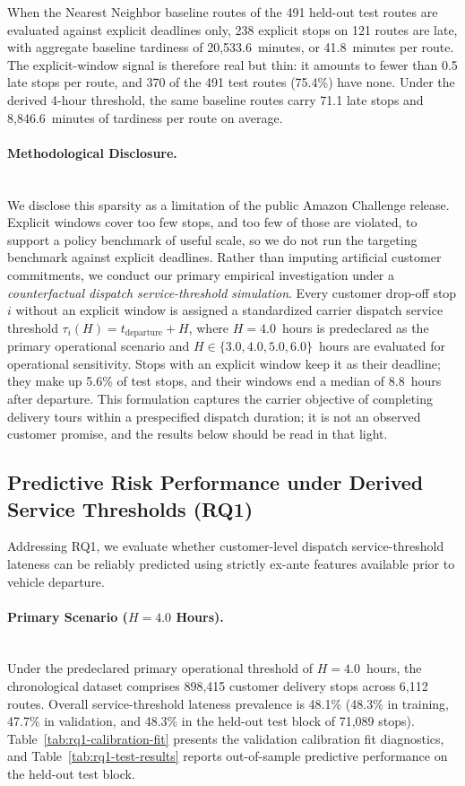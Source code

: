 \documentclass[11pt,a4paper]{article}
\begin{document}
When the Nearest Neighbor baseline routes of the 491 held-out test routes are evaluated against explicit deadlines only, 238 explicit stops on 121 routes are late, with aggregate baseline tardiness of 20,533.6~minutes, or 41.8~minutes per route. The explicit-window signal is therefore real but thin: it amounts to fewer than 0.5 late stops per route, and 370 of the 491 test routes (75.4\%) have none. Under the derived 4-hour threshold, the same baseline routes carry 71.1 late stops and 8,846.6~minutes of tardiness per route on average.

\paragraph{Methodological Disclosure.}\mbox{}\\
We disclose this sparsity as a limitation of the public Amazon Challenge release. Explicit windows cover too few stops, and too few of those are violated, to support a policy benchmark of useful scale, so we do not run the targeting benchmark against explicit deadlines. Rather than imputing artificial customer commitments, we conduct our primary empirical investigation under a \emph{counterfactual dispatch service-threshold simulation}. Every customer drop-off stop $i$ without an explicit window is assigned a standardized carrier dispatch service threshold $\tau_i(H) = t_{\text{departure}} + H$, where $H = 4.0$~hours is predeclared as the primary operational scenario and $H \in \{3.0, 4.0, 5.0, 6.0\}$~hours are evaluated for operational sensitivity. Stops with an explicit window keep it as their deadline; they make up 5.6\% of test stops, and their windows end a median of 8.8~hours after departure. This formulation captures the carrier objective of completing delivery tours within a prespecified dispatch duration; it is not an observed customer promise, and the results below should be read in that light.

\subsection{Predictive Risk Performance under Derived Service Thresholds (RQ1)}\label{sec:res-rq1}

Addressing RQ1, we evaluate whether customer-level dispatch service-threshold lateness can be reliably predicted using strictly ex-ante features available prior to vehicle departure.

\paragraph{Primary Scenario ($H = 4.0$ Hours).}\mbox{}\\
Under the predeclared primary operational threshold of $H = 4.0$~hours, the chronological dataset comprises 898,415 customer delivery stops across 6,112 routes. Overall service-threshold lateness prevalence is 48.1\% (48.3\% in training, 47.7\% in validation, and 48.3\% in the held-out test block of 71,089 stops). Table~\ref{tab:rq1-calibration-fit} presents the validation calibration fit diagnostics, and Table~\ref{tab:rq1-test-results} reports out-of-sample predictive performance on the held-out test block.
\end{document}
